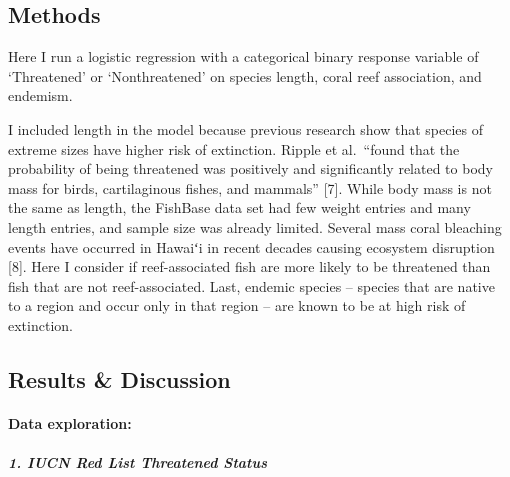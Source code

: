\documentclass[
  letterpaper,
  DIV=11,
  numbers=noendperiod]{scrartcl}
\let\oldparagraph\paragraph
\renewcommand{\paragraph}[1]{\oldparagraph{#1}\mbox{}}
\let\oldsubparagraph\subparagraph
\renewcommand{\subparagraph}[1]{\oldsubparagraph{#1}\mbox{}}
\newenvironment{Shaded}{\begin{snugshade}}{\end{snugshade}}
\newcommand{\AttributeTok}[1]{\textcolor[rgb]{0.40,0.45,0.13}{#1}}
\newcommand{\FunctionTok}[1]{\textcolor[rgb]{0.28,0.35,0.67}{#1}}
\newcommand{\NormalTok}[1]{\textcolor[rgb]{0.00,0.23,0.31}{#1}}
\newcommand{\OtherTok}[1]{\textcolor[rgb]{0.00,0.23,0.31}{#1}}
\newcommand{\SpecialCharTok}[1]{\textcolor[rgb]{0.37,0.37,0.37}{#1}}
\newcommand{\StringTok}[1]{\textcolor[rgb]{0.13,0.47,0.30}{#1}}
\begin{document}
\hypertarget{methods}{%
\subsection{Methods}\label{methods}}

Here I run a logistic regression with a categorical binary response
variable of `Threatened' or `Nonthreatened' on species length, coral
reef association, and endemism.

I included length in the model because previous research show that
species of extreme sizes have higher risk of extinction. Ripple et
al.~``found that the probability of being threatened was positively and
significantly related to body mass for birds, cartilaginous fishes, and
mammals'' {[}7{]}. While body mass is not the same as length, the
FishBase data set had few weight entries and many length entries, and
sample size was already limited. Several mass coral bleaching events
have occurred in Hawaiʻi in recent decades causing ecosystem disruption
{[}8{]}. Here I consider if reef-associated fish are more likely to be
threatened than fish that are not reef-associated. Last, endemic species
-- species that are native to a region and occur only in that region --
are known to be at high risk of extinction.

\hypertarget{results-discussion}{%
\subsection{Results \& Discussion}\label{results-discussion}}

\hypertarget{data-exploration}{%
\paragraph{Data exploration:}\label{data-exploration}}

\hypertarget{iucn-red-list-threatened-status}{%
\subparagraph{1. IUCN Red List Threatened
Status}\label{iucn-red-list-threatened-status}}

\begin{Shaded}
\end{Shaded}
\end{document}
